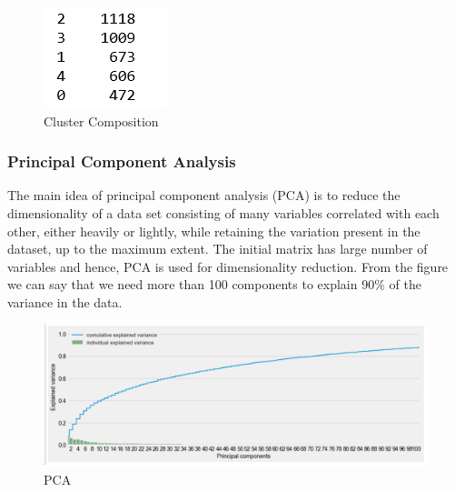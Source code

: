 \begin{figure}[H]
\caption{Cluster Composition}
\label{3.4}
\centering
\includegraphics[width=\columnwidth]{images/3_4.PNG}
\end{figure}

\subsubsection{\textbf{Principal Component Analysis}}

The main idea of principal component analysis (PCA) is to reduce the dimensionality of a data set consisting of many variables correlated with each other, either heavily or lightly, while retaining the variation present in the dataset, up to the maximum extent. The initial matrix has large number of variables and hence, PCA is used for dimensionality reduction. From the figure we can say that we need more than 100 components to explain 90\% of the variance in the data.\\

\begin{figure}[H]
\caption{PCA}
\label{3.5}
\centering
\includegraphics[width=\columnwidth]{images/3_5.PNG}
\end{figure}

